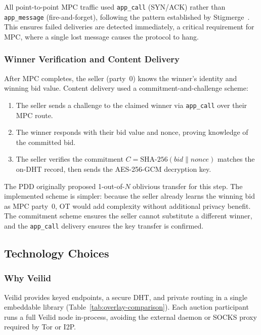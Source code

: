 All point-to-point MPC traffic used \texttt{app\_call} (SYN/ACK)
rather than \texttt{app\_message} (fire-and-forget), following the pattern
established by Stigmerge~\cite{stigmerge2024}.  This ensures failed deliveries
are detected immediately, a critical requirement for MPC, where a single
lost message causes the protocol to hang.

\subsubsection{Winner Verification and Content Delivery}
\label{sec:method-verification}

After MPC completes, the seller (party~0) knows the winner's identity and
winning bid value.  Content delivery used a commitment-and-challenge scheme:

\begin{enumerate}
  \item The seller sends a challenge to the claimed winner via
    \texttt{app\_call} over their MPC route.
  \item The winner responds with their bid value and nonce, proving knowledge
    of the committed bid.
  \item The seller verifies the commitment
    $C = \text{SHA-256}(\mathit{bid} \| \mathit{nonce})$ matches the on-DHT
    record, then sends the AES-256-GCM decryption key.
\end{enumerate}

The PDD originally proposed 1-out-of-$N$ oblivious transfer for this step.
The implemented scheme is simpler: because the seller already learns the
winning bid as MPC party~0, OT would add complexity without additional privacy
benefit.  The commitment scheme ensures the seller cannot substitute a
different winner, and the \texttt{app\_call} delivery ensures the key transfer
is confirmed.

\subsection{Technology Choices}
\label{sec:method-tech}

\subsubsection{Why Veilid}

Veilid provides keyed endpoints, a secure DHT, and private routing in a
single embeddable library (Table~\ref{tab:overlay-comparison}).  Each auction
participant runs a full Veilid node in-process, avoiding the external daemon
or SOCKS proxy required by Tor or I2P.

